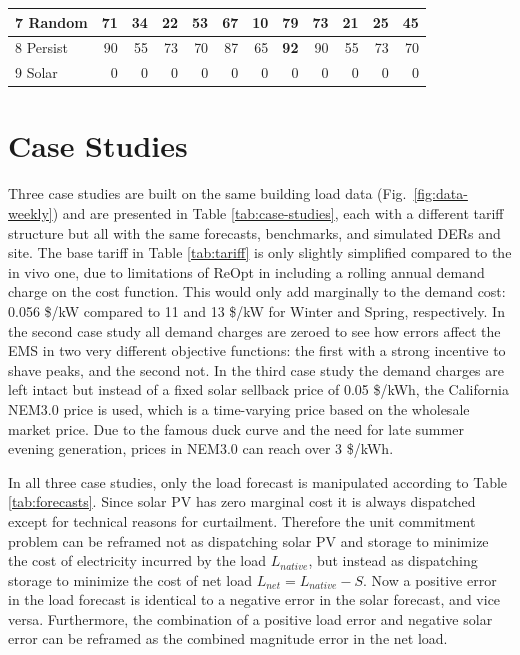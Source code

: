 \documentclass[conference]{IEEEtran}
\begin{document}
\begin{table}[t]
\begin{tabular}{l r r r r r r r r r r r}
        7 Random     & 71     & 34     & 22     & 53          & 67     & 10     & 79          & 73     & 21     & 25     & 45          \\ \hline
        8 Persist    & 90     & 55     & 73     & 70          & 87     & 65     & \textbf{92} & 90     & 55     & 73     & 70          \\ \hline
        9 Solar      & 0      & 0      & 0      & 0           & 0      & 0      & 0           & 0      & 0      & 0      & 0           \\ \hline
    \end{tabular}
\end{table}

\section{Case Studies}

Three case studies are built on the same building load data (Fig.~\ref{fig:data-weekly}) and are presented in Table \ref{tab:case-studies}, each with a different tariff structure but all with the same forecasts, benchmarks, and simulated DERs and site. The base tariff in Table \ref{tab:tariff} is only slightly simplified compared to the in vivo one, due to limitations of ReOpt in including a rolling annual demand charge on the cost function. This would only add marginally to the demand cost: 0.056 \$/kW compared to 11 and 13 \$/kW for Winter and Spring, respectively. In the second case study all demand charges are zeroed to see how errors affect the EMS in two very different objective functions: the first with a strong incentive to shave peaks, and the second not. In the third case study the demand charges are left intact but instead of a fixed solar sellback price of 0.05 \$/kWh, the California NEM3.0 price is used, which is a time-varying price based on the wholesale market price. Due to the famous duck curve and the need for late summer evening generation, prices in NEM3.0 can reach over 3 \$/kWh.

In all three case studies, only the load forecast is manipulated according to Table \ref{tab:forecasts}. Since solar PV has zero marginal cost it is always dispatched except for technical reasons for curtailment. Therefore the unit commitment problem can be reframed not as dispatching solar PV and storage to minimize the cost of electricity incurred by the load $L_{native}$, but instead as dispatching storage to minimize the cost of net load $L_{net}=L_{native}-S$. Now a positive error in the load forecast is identical to a negative error in the solar forecast, and vice versa. Furthermore, the combination of a positive load error and negative solar error can be reframed as the combined magnitude error in the net load.  
\end{document}
